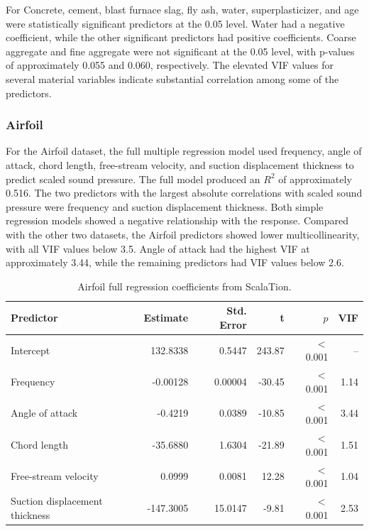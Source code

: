 \documentclass{article}
\begin{document}
For Concrete, cement, blast furnace slag, fly ash, water, superplasticizer, and age were statistically significant predictors at the 0.05 level. Water had a negative coefficient, while the other significant predictors had positive coefficients. Coarse aggregate and fine aggregate were not significant at the 0.05 level, with p-values of approximately 0.055 and 0.060, respectively. The elevated VIF values for several material variables indicate substantial correlation among some of the predictors.





\subsubsection{Airfoil}

For the Airfoil dataset, the full multiple regression model used frequency, angle of attack, chord length, free-stream velocity, and suction displacement thickness to predict scaled sound pressure. The full model produced an $R^2$ of approximately 0.516. The two predictors with the largest absolute correlations with scaled sound pressure were frequency and suction displacement thickness. Both simple regression models showed a negative relationship with the response. Compared with the other two datasets, the Airfoil predictors showed lower multicollinearity, with all VIF values below 3.5. Angle of attack had the highest VIF at approximately 3.44, while the remaining predictors had VIF values below 2.6.

\begin{table}[H]
\centering
\small
\caption{Airfoil full regression coefficients from ScalaTion.}
\label{tab:airfoil-scalation-coefficients}
\begin{tabular}{lrrrrr}
\hline
Predictor & Estimate & Std. Error & t & $p$ & VIF \\
\hline
Intercept & 132.8338 & 0.5447 & 243.87 & $<$0.001 & -- \\
Frequency & -0.00128 & 0.00004 & -30.45 & $<$0.001 & 1.14 \\
Angle of attack & -0.4219 & 0.0389 & -10.85 & $<$0.001 & 3.44 \\
Chord length & -35.6880 & 1.6304 & -21.89 & $<$0.001 & 1.51 \\
Free-stream velocity & 0.0999 & 0.0081 & 12.28 & $<$0.001 & 1.04 \\
Suction displacement thickness & -147.3005 & 15.0147 & -9.81 & $<$0.001 & 2.53 \\
\hline
\end{tabular}
\end{table}
\end{document}
